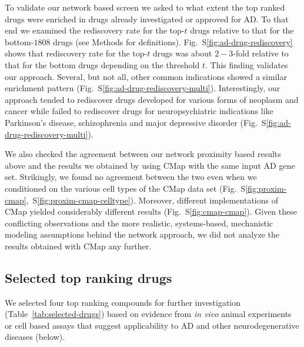 \documentclass[letterpaper]{article}
\begin{document}
To validate our network based screen we asked to what extent the top ranked
drugs were enriched in drugs already investigated or approved for AD.  To that
end we examined the rediscovery rate for the top-$t$ drugs relative to that
for the bottom-$1808$ drugs (see Methods for definitions).
Fig.~S\ref{fig:ad-drug-rediscovery} shows that rediscovery rate for the
top-$t$ drugs was about $2-3$-fold relative to that for the bottom drugs
depending on the threshold $t$.  This finding validates our approach.
Several, but not all, other common indications showed a similar enrichment
pattern (Fig.~S\ref{fig:ad-drug-rediscovery-multi}).  Interestingly, our
approach tended to rediscover drugs developed for various forms of neoplasm
and cancer while failed to rediscover drugs for neuropsychiatric indications
like Parkinson's disease, schizophrenia and major depressive disorder
(Fig.~S\ref{fig:ad-drug-rediscovery-multi}). %

We also checked the agreement between our network proximity based results
above and the results we obtained by using CMap with the same input AD gene
set.  Strikingly, we found no agreement between the two even when we
conditioned on the various cell types of the CMap data set
(Fig.~S\ref{fig:proxim-cmap},~S\ref{fig:proxim-cmap-celltype}).  Moreover,
different implementations of CMap yielded considerably different results
(Fig.~S\ref{fig:cmap-cmap}).  Given these conflicting observations and the
more realistic, systems-based, mechanistic modeling assumptions behind the
network approach, we did not analyze the results obtained with CMap any
further.

\subsection{Selected top ranking drugs}

We selected four top ranking compounds for further investigation
(Table~\ref{tab:selected-drugs}) based on evidence from \emph{in vivo} animal
experiments or cell based assays that suggest applicability to AD and other
neurodegenerative diseases (below).
\end{document}

